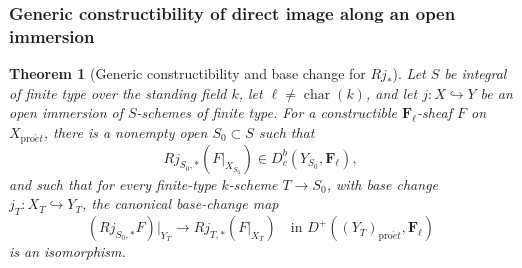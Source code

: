 \documentclass[11pt,a4paper]{article}
\numberwithin{equation}{section}
\newtheorem{theorem}{Theorem}[section]
\theoremstyle{definition}
\theoremstyle{remark}
\newcommand{\Dbc}{D^b_c}
\newcommand{\Fell}{\mathbf F_\ell}
\newcommand{\proet}{\mathrm{pro}\acute{e}t}
\begin{document}
\subsubsection{Generic constructibility of direct image along an open immersion}

\begin{theorem}[Generic constructibility and base change for \(Rj_*\)]
\label{b:thm:geo-generic-open}
Let \(S\) be integral of finite type over the standing field \(k\), let
\(\ell\ne\operatorname{char}(k)\), and let \(j:X\hookrightarrow Y\) be
an open immersion of \(S\)-schemes of finite type. For a constructible
\(\Fell\)-sheaf \(F\) on \(X_{\proet}\), there is a nonempty open
\(S_0\subset S\) such that
\[
 Rj_{S_0,*}(F|_{X_{S_0}})\in\Dbc(Y_{S_0},\Fell),
                                                               \tag{G21}
\]
and such that for every finite-type $k$-scheme \(T\to S_0\), with base change
\(j_T:X_T\hookrightarrow Y_T\), the canonical base-change map
\[
 (Rj_{S_0,*}F)|_{Y_T}
          \longrightarrow Rj_{T,*}(F|_{X_T})
          \quad\text{in }D^+((Y_T)_{\proet},\Fell)             \tag{G22}
\]
is an isomorphism.
\end{theorem}
\end{document}
